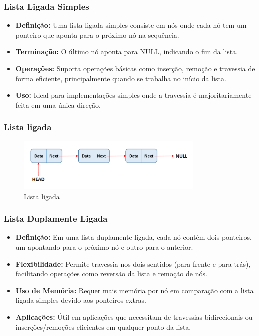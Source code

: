 \begin{frame}[fragile]
  \frametitle{Lista Ligada Simples}
  \begin{itemize}
    \item \textbf{Definição:} Uma lista ligada simples consiste em nós onde cada nó tem um ponteiro que aponta para o próximo nó na sequência.
    \item \textbf{Terminação:} O último nó aponta para NULL, indicando o fim da lista.
    \item \textbf{Operações:} Suporta operações básicas como inserção, remoção e travessia de forma eficiente, principalmente quando se trabalha no início da lista.
    \item \textbf{Uso:} Ideal para implementações simples onde a travessia é majoritariamente feita em uma única direção.
  \end{itemize}
\end{frame}

\begin{frame}[fragile]
  \frametitle{Lista ligada}
  \begin{figure}
    \centering
    \includegraphics[width=0.8\textwidth]{aulas/aula3-lista-ligada1.png}
    \caption{Lista ligada}
  \end{figure}
\end{frame}
\begin{frame}[fragile]
  \frametitle{Lista Duplamente Ligada}
  \begin{itemize}
    \item \textbf{Definição:} Em uma lista duplamente ligada, cada nó contém dois ponteiros, um apontando para o próximo nó e outro para o anterior.
    \item \textbf{Flexibilidade:} Permite travessia nos dois sentidos (para frente e para trás), facilitando operações como reversão da lista e remoção de nós.
    \item \textbf{Uso de Memória:} Requer mais memória por nó em comparação com a lista ligada simples devido aos ponteiros extras.
    \item \textbf{Aplicações:} Útil em aplicações que necessitam de travessias bidirecionais ou inserções/remoções eficientes em qualquer ponto da lista.
  \end{itemize}
\end{frame}

